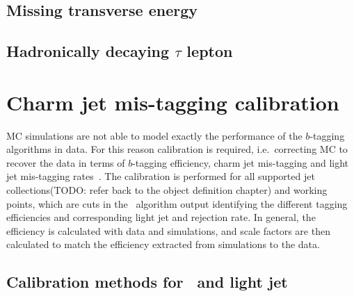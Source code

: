 \documentclass[letterpaper,12pt]{article}
\begin{document}
\subsection{Missing transverse energy}
\subsection{Hadronically decaying $\tau$ lepton}


\section{Charm jet mis-tagging calibration}
MC simulations are not able to model exactly the 
performance of the $b$-tagging algorithms in data. For this reason 
calibration is required, i.e.\ correcting MC to recover the data 
in terms of $b$-tagging efficiency, charm jet mis-tagging and 
light jet mis-tagging rates~\cite{FTAG-2018-01}. The calibration is performed 
for all supported jet collections(TODO: refer back to the object definition chapter)
and working points, which are cuts in the \btagging\ 
algorithm output identifying the different tagging efficiencies 
and corresponding light jet and \cjet rejection rate.
In general, the efficiency is calculated with data and simulations, 
and scale factors are then calculated to match the efficiency extracted 
from simulations to the data.
\subsection{Calibration methods for \bjet\ and light jet}
\end{document}
